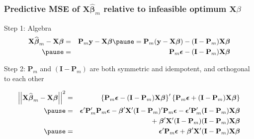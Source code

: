 \begin{frame}
  \frametitle{Predictive MSE of $\mathbf{X}\widehat{\boldsymbol{\beta}}_m$ relative to infeasible optimum $\boldsymbol{X}\beta$}


  \begin{block}{\small Step 1: Algebra}
    \vspace{-1em}
    \small
    \begin{eqnarray*}
      \mathbf{X}\widehat{\boldsymbol{\beta}}_m - \mathbf{X}\boldsymbol{\beta} &=& \mathbf{P}_m \mathbf{y} - \mathbf{X}\boldsymbol{\beta} \pause =  \mathbf{P}_m(\mathbf{y}-\mathbf{X}\boldsymbol{\beta}) - (\mathbf{I} - \mathbf{P}_m)\mathbf{X}\boldsymbol{\beta} \\ \pause
  &=& \mathbf{P}_m \boldsymbol{\epsilon} - (\mathbf{I}- \mathbf{P}_m)\mathbf{X}\boldsymbol{\beta}
    \end{eqnarray*}
  \end{block}

  \pause
  \vspace{-1em}

  \begin{block}{\small Step 2: $\mathbf{P}_m$ and $(\mathbf{I} - \mathbf{P}_m)$ are both symmetric and idempotent, and orthogonal to each other} 
    \small

    \vspace{-1em}
\begin{eqnarray*}
  \left|\left|\mathbf{X}\widehat{\boldsymbol{\beta}}_m - \mathbf{X}\boldsymbol{\beta}\right|\right|^2 &=&\left\{ \mathbf{P}_m \boldsymbol{\epsilon} - (\mathbf{I}- \mathbf{P}_m)\mathbf{X}\boldsymbol{\beta}\right\}'\left\{ \mathbf{P}_m \boldsymbol{\epsilon} + (\mathbf{I}- \mathbf{P}_m)\mathbf{X}\boldsymbol{\beta} \right\}\\ \pause
  &=&\boldsymbol{\epsilon}'\mathbf{P}_m'\mathbf{P}_m \boldsymbol{\epsilon} - \boldsymbol{\beta}'\mathbf{X}'(\mathbf{I}-\mathbf{P}_m)'\mathbf{P}_m\boldsymbol{\epsilon} - \boldsymbol{\epsilon}'\mathbf{P}_m'(\mathbf{I} - \mathbf{P}_m)\mathbf{X}\boldsymbol{\beta}\\
  &&\quad \quad + \; \boldsymbol{\beta}'\mathbf{X}' (\mathbf{I} - \mathbf{P}_m)(\mathbf{I} - \mathbf{P}_m)\mathbf{X}\boldsymbol{\beta}\\ \pause
  &=& \boldsymbol{\epsilon}'\mathbf{P}_m \boldsymbol{\epsilon} + \boldsymbol{\beta}'\mathbf{X}'(\mathbf{I} - \mathbf{P}_m)\mathbf{X}\boldsymbol{\beta}
\end{eqnarray*}
  \end{block}

\end{frame}
